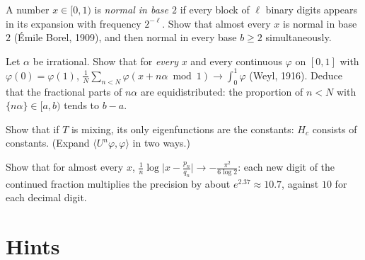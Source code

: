 \begin{exercise}[$\star\star$]\label{ex:normal}
A number $x\in[0,1)$ is \emph{normal in base $2$} if every block of $\ell$ binary digits appears in its expansion with frequency $2^{-\ell}$. Show that almost every $x$ is normal in base $2$ (\'Emile Borel, 1909), and then normal in every
base $b\ge2$ simultaneously.
\end{exercise}

\begin{exercise}[$\star\star$]\label{ex:weyl}
Let $\alpha$ be irrational. Show that for \emph{every} $x$ and every continuous $\varphi$ on $[0,1]$ with $\varphi(0)=\varphi(1)$, $\frac1N\sum_{n<N}\varphi(x+n\alpha\bmod1)\to\int_0^1\varphi$ (Weyl, 1916). Deduce that the fractional parts of $n\alpha$ are
equidistributed: the proportion of $n<N$ with $\{n\alpha\}\in[a,b)$ tends to $b-a$.
\end{exercise}

\begin{exercise}[$\star\star$]\label{ex:mixingeigen}
Show that if $T$ is mixing, its only eigenfunctions are the constants: $H_c$ consists of constants. (Expand $\langle U^n\varphi,\varphi\rangle$ in two ways.)
\end{exercise}

\begin{exercise}[$\star\star$]\label{ex:approxrate}
Show that for almost every $x$, $\frac1n\log\bigl|x-\frac{p_n}{q_n}\bigr|\to-\frac{\pi^2}{6\log2}$: each new digit of the continued fraction multiplies the precision by about $e^{2.37}\approx10.7$, against $10$ for each decimal digit.
\end{exercise}

\section{Hints}

